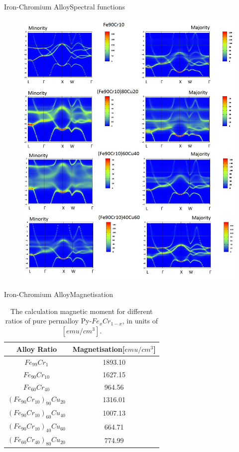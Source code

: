 \documentclass{beamer}
\begin{document}
\begin{frame}{Iron-Chromium Alloy}{Spectral functions}
 \begin{figure}[h!]
    \centering
    \begin{measuredfigure}
    \includegraphics[scale=0.16]{Fe90Cr10}
    \end{measuredfigure}
    \end{figure}
\end{frame}
\begin{frame}{Iron-Chromium Alloy}{Magnetisation}
  \begin{table}[h!]
\centering
 \begin{tabular}{||c c||} 
 \hline
 Alloy Ratio & Magnetisation[$emu/cm^3$] \\ [1ex] 
 \hline\hline
 $Fe_{99}Cr_1$ & 1893.10\\ 
 $Fe_{90}Cr_{10}$ & 1627.15\\
 $Fe_{60}Cr_{40}$ & 964.56 \\
 $(Fe_{90}Cr_{10})_{90}Cu_{20}$ & 1316.01\\ 
 $(Fe_{90}Cr_{10})_{60}Cu_{40}$ & 1007.13\\  
 $(Fe_{90}Cr_{10})_{40}Cu_{60}$ & 664.71\\
 $(Fe_{60}Cr_{40})_{80}Cu_{20}$ & 774.99\\ [1ex]
 \hline
 \end{tabular}
\caption{The calculation magnetic moment for different ratios of pure permalloy Py-$Fe_{x}Cr_{1-x}$, in units of $[emu/cm^3]$.} 
\end{table}
\end{frame}
\end{document}
